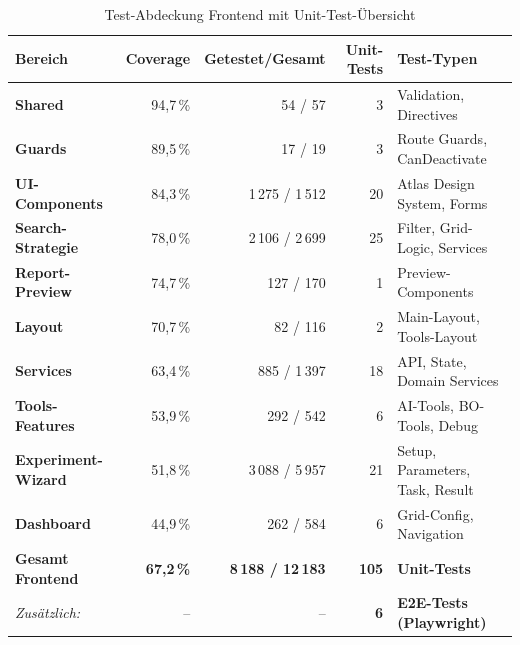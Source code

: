 

\begin{table}[H]
\centering
\caption{Test-Abdeckung Frontend mit Unit-Test-Übersicht}
\label{tab:frontend-coverage-mit-tests}
\renewcommand{\arraystretch}{1.3}
\small %
\begin{tabularx}{\textwidth}{@{}lrrrX@{}}
\toprule
\textbf{Bereich} & \textbf{Coverage} & \textbf{Getestet/Gesamt} & \textbf{Unit-Tests} & \textbf{Test-Typen} \\
\midrule
\textbf{Shared} & \cellcolor{green!20}94,7\,\% & 54 / 57 & 3 & Validation, Directives \\
\addlinespace[1pt]
\textbf{Guards} & \cellcolor{green!20}89,5\,\% & 17 / 19 & 3 & Route Guards, CanDeactivate \\
\addlinespace[1pt]
\textbf{UI-Components} & \cellcolor{yellow!20}84,3\,\% & 1\,275 / 1\,512 & 20 & Atlas Design System, Forms \\
\addlinespace[1pt]
\textbf{Search-Strategie} & \cellcolor{yellow!20}78,0\,\% & 2\,106 / 2\,699 & 25 & Filter, Grid-Logic, Services \\
\addlinespace[1pt]
\textbf{Report-Preview} & \cellcolor{yellow!20}74,7\,\% & 127 / 170 & 1 & Preview-Components \\
\addlinespace[1pt]
\textbf{Layout} & \cellcolor{yellow!20}70,7\,\% & 82 / 116 & 2 & Main-Layout, Tools-Layout \\
\addlinespace[1pt]
\textbf{Services} & \cellcolor{orange!20}63,4\,\% & 885 / 1\,397 & 18 & API, State, Domain Services \\
\addlinespace[1pt]
\textbf{Tools-Features} & \cellcolor{red!20}53,9\,\% & 292 / 542 & 6 & AI-Tools, BO-Tools, Debug \\
\addlinespace[1pt]
\textbf{Experiment-Wizard} & \cellcolor{red!20}51,8\,\% & 3\,088 / 5\,957 & 21 & Setup, Parameters, Task, Result \\
\addlinespace[1pt]
\textbf{Dashboard} & \cellcolor{red!20}44,9\,\% & 262 / 584 & 6 & Grid-Config, Navigation \\
\midrule
\textbf{Gesamt Frontend} & \textbf{67,2\,\%} & \textbf{8\,188 / 12\,183} & \textbf{105} & \textbf{Unit-Tests} \\
\addlinespace[1pt]
\textit{Zusätzlich:} & -- & -- & \textbf{6} & \textbf{E2E-Tests (Playwright)} \\
\bottomrule
\end{tabularx}
\end{table}

